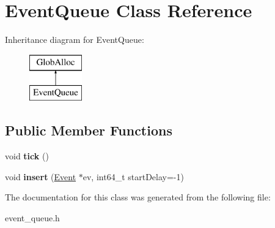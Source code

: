\hypertarget{classEventQueue}{\section{Event\-Queue Class Reference}
\label{classEventQueue}
}
Inheritance diagram for Event\-Queue\-:\begin{figure}[H]
\begin{center}
\leavevmode
\includegraphics[height=2.000000cm]{classEventQueue}
\end{center}
\end{figure}
\subsection*{Public Member Functions}
\begin{DoxyCompactItemize}
\item 
\hypertarget{classEventQueue_afe0fdec3ed03ebe47b84e62b22842792}{void {\bfseries tick} ()}\label{classEventQueue_afe0fdec3ed03ebe47b84e62b22842792}

\item 
\hypertarget{classEventQueue_ab1d640e2257550aec21cc953fb524ac2}{void {\bfseries insert} (\hyperlink{classEvent}{Event} $\ast$ev, int64\-\_\-t start\-Delay=-\/1)}\label{classEventQueue_ab1d640e2257550aec21cc953fb524ac2}

\end{DoxyCompactItemize}


The documentation for this class was generated from the following file\-:\begin{DoxyCompactItemize}
\item 
event\-\_\-queue.\-h\end{DoxyCompactItemize}
